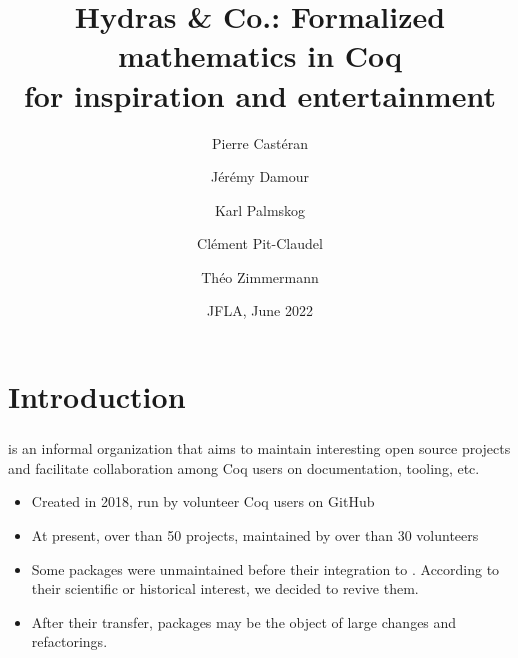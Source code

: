 \documentclass[10pt, fleqn]{beamer}
\title{Hydras \& Co.: Formalized mathematics in Coq\\
  for inspiration and entertainment
}
\date{JFLA, June 2022}
\author{
  Pierre Castéran \inst{1}
  \and
  Jérémy Damour \inst{2}
  \and
  Karl Palmskog \inst{3}
  \and Clément Pit-Claudel \inst{4}
  \and Théo Zimmermann \inst{5}
}
\institute{
  Univ. Bordeaux, CNRS, Bordeaux INP, LaBRI, UMR 5800, F-33400 Talence, France  %
  \and
  Univ. de Paris, F-75013 Paris, France
  \and
  KTH Royal Institute of Technology, Stockholm, Sweden
  \and
  MIT CSAIL, Cambridge, Massachusetts, USA
  \and
  Inria, Univ. de Paris, CNRS, IRIF, UMR 8243, F-75013 Paris, France
}
\begin{document}

\begin{frame}
  \maketitle
\end{frame}

\section{Introduction}
\begin{frame}
    \frametitle{\community}
    \begin{block}{}
      \community is an informal organization that aims to maintain interesting open source \coq projects and facilitate collaboration among Coq users on documentation, tooling, etc.
      \begin{itemize}
      \item Created in 2018,  run by volunteer Coq users on GitHub
      \item At present, over than 50 projects, maintained by over than 30 volunteers
      \item Some packages were unmaintained before their integration to \community. According to their scientific or historical interest, we decided to revive them.
        \item After their transfer, packages may be the object of large changes  and refactorings.
      \end{itemize}
    \end{block}
  \end{frame}
\end{document}
